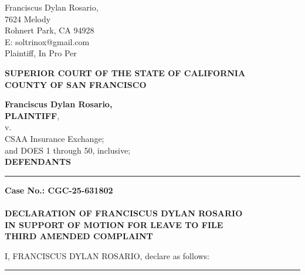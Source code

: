 

\nolinenumbers
\begin{singlespace}
Franciscus Dylan Rosario, \\
7624 Melody \\
Rohnert Park, CA 94928 \\
E: soltrinox@gmail.com \\
Plaintiff, In Pro Per \\
\end{singlespace}
\vspace*{9mm}
\begin{tightcenter}
\textbf{SUPERIOR COURT OF THE STATE OF CALIFORNIA} \\
\textbf{COUNTY OF SAN FRANCISCO}
\end{tightcenter}
\vspace*{2.25mm}
\nolinenumbers
\begin{minipage}[t]{3in}
    \raggedright
    \textbf{Franciscus Dylan Rosario,} \\ \textbf{PLAINTIFF}, \\
    \hspace{1cm} v. \\
    \small
    CSAA Insurance Exchange; \\
    and DOES 1 through 50, inclusive; \\
    \normalsize
    \textbf{DEFENDANTS}
    \makebox[3in]{\hrulefill}
\end{minipage}%
\hspace{3mm}
\begin{minipage}[t]{0.5pt}
    \vspace{0pt}
    \rule{0.5pt}{2.0in}
\end{minipage}
\hspace{3mm}
\begin{minipage}[t]{3in}
    \raggedright
    \noindent \textbf{Case No.: CGC-25-631802} \\
    ~\\
    \textbf{DECLARATION OF FRANCISCUS DYLAN ROSARIO} \\
    \textbf{IN SUPPORT OF MOTION FOR LEAVE TO FILE} \\
    \textbf{THIRD AMENDED COMPLAINT}
\end{minipage}
\vspace*{6mm}
\linenumbers
I, FRANCISCUS DYLAN ROSARIO, declare as follows:

\begin{center}\rule{0.5\linewidth}{0.5pt}\end{center}

